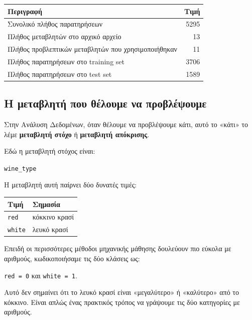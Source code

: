 \documentclass[12pt,a4paper]{article}
\newcommand{\code}[1]{\texttt{\textenglish{#1}}}
\begin{document}
\begin{center}
\begin{tabular}{lr}
\toprule
\textbf{Περιγραφή} & \textbf{Τιμή} \\
\midrule
Συνολικό πλήθος παρατηρήσεων & 5295 \\
Πλήθος μεταβλητών στο αρχικό αρχείο & 13 \\
Πλήθος προβλεπτικών μεταβλητών που χρησιμοποιήθηκαν & 11 \\
Πλήθος παρατηρήσεων στο training set & 3706 \\
Πλήθος παρατηρήσεων στο test set & 1589 \\
\bottomrule
\end{tabular}
\end{center}

\subsection{Η μεταβλητή που θέλουμε να προβλέψουμε}

Στην Ανάλυση Δεδομένων, όταν θέλουμε να προβλέψουμε κάτι, αυτό το «κάτι» το
λέμε \textbf{μεταβλητή στόχο} ή \textbf{μεταβλητή απόκρισης}.

Εδώ η μεταβλητή στόχος είναι:

\begin{center}
\code{wine\_type}
\end{center}

Η μεταβλητή αυτή παίρνει δύο δυνατές τιμές:

\begin{center}
\begin{tabular}{ll}
\toprule
\textbf{Τιμή} & \textbf{Σημασία} \\
\midrule
\code{red} & κόκκινο κρασί \\
\code{white} & λευκό κρασί \\
\bottomrule
\end{tabular}
\end{center}

Επειδή οι περισσότερες μέθοδοι μηχανικής μάθησης δουλεύουν πιο εύκολα με
αριθμούς, κωδικοποιήσαμε τις δύο κλάσεις ως:

\begin{center}
\code{red = 0} \hspace{1cm} και \hspace{1cm} \code{white = 1}.
\end{center}

Αυτό δεν σημαίνει ότι το λευκό κρασί είναι «μεγαλύτερο» ή «καλύτερο» από το
κόκκινο. Είναι απλώς ένας πρακτικός τρόπος να γράψουμε τις δύο κατηγορίες με
αριθμούς.
\end{document}
